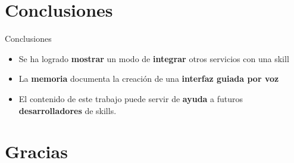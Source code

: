 \documentclass{beamer}
\begin{document}
  \section{Conclusiones} %

  \begin{frame}{Conclusiones}
    \begin{itemize}
      \setlength\itemsep{1.5em}
      \item Se ha logrado \textbf{mostrar} un modo de \textbf{integrar} otros servicios con una skill
      \item La \textbf{memoria} documenta la creación de una \textbf{interfaz guiada por voz}
      \item El contenido de este trabajo puede servir de \textbf{ayuda} a futuros \textbf{desarrolladores} de skills.
    \end{itemize}
  \end{frame}

  \section*{Gracias}
\end{document}
